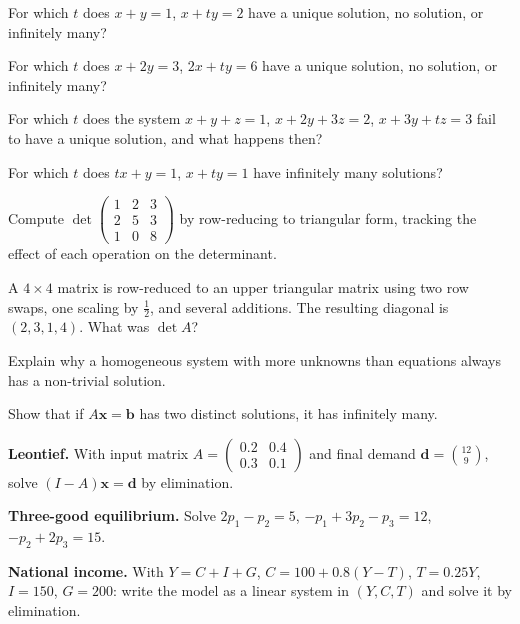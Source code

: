 \begin{problems}[resume]
  \item For which $t$ does $x+y=1$, \;$x+ty=2$ have a unique solution, no
        solution, or infinitely many?
  \item For which $t$ does $x+2y=3$, \;$2x+ty=6$ have a unique solution, no
        solution, or infinitely many?
  \item For which $t$ does the system $x+y+z=1$, \;$x+2y+3z=2$,
        \;$x+3y+tz=3$ fail to have a unique solution, and what happens
        then?
  \item For which $t$ does $tx+y=1$, \;$x+ty=1$ have infinitely many
        solutions?
  \item Compute $\det\begin{pmatrix}1&2&3\\2&5&3\\1&0&8\end{pmatrix}$ by
        row-reducing to triangular form, tracking the effect of each
        operation on the determinant.
  \item A $4\times4$ matrix is row-reduced to an upper triangular matrix
        using two row swaps, one scaling by $\tfrac12$, and several
        additions. The resulting diagonal is $(2,3,1,4)$. What was
        $\det A$?
  \item Explain why a homogeneous system with more unknowns than equations
        always has a non-trivial solution.
  \item Show that if $A\mathbf{x}=\mathbf{b}$ has two distinct solutions,
        it has infinitely many.
\end{problems}

\begin{problems}[resume]
  \item \textbf{Leontief.} With input matrix
        $A=\begin{pmatrix}0.2&0.4\\0.3&0.1\end{pmatrix}$ and final demand
        $\mathbf{d}=\binom{12}{9}$, solve
        $(I-A)\mathbf{x}=\mathbf{d}$ by elimination.
  \item \textbf{Three-good equilibrium.} Solve
        $2p_{1}-p_{2}=5$, \;$-p_{1}+3p_{2}-p_{3}=12$,
        \;$-p_{2}+2p_{3}=15$.
  \item \textbf{National income.} With $Y=C+I+G$,
        $C=100+0.8(Y-T)$, $T=0.25Y$, $I=150$, $G=200$: write the model as a
        linear system in $(Y,C,T)$ and solve it by elimination.
\end{problems}

